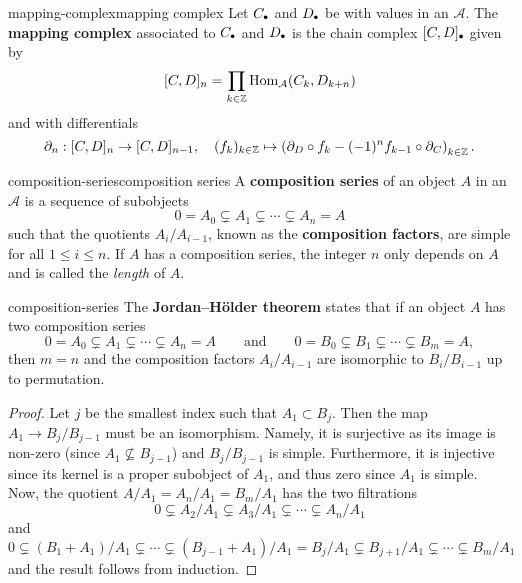 \begin{topic}{mapping-complex}{mapping complex}
    Let $C_\bdot$ and $D_\bdot$ be  with values in an  $\mathcal{A}$. The \textbf{mapping complex} associated to $C_\bdot$ and $D_\bdot$ is the chain complex $[C, D] _\bdot$ given by
    \[ [C, D]_n = \prod_{k \in \mathbb{Z}} \text{Hom}_\mathcal{A}(C_k, D_{k + n}) \]
    and with differentials
    \[ \partial_n : [C, D]_n \to [C, D]_{n - 1}, \quad (f_k)_{k \in \mathbb{Z}} \mapsto \left(\partial_D \circ f_k - (-1)^n f_{k - 1} \circ \partial_C \right)_{k \in \mathbb{Z}} . \]
\end{topic}

\begin{topic}{composition-series}{composition series}
    A \textbf{composition series} of an object $A$ in an  $\mathcal{A}$ is a sequence of subobjects
    \[ 0 = A_0 \subsetneq A_1 \subsetneq \cdots \subsetneq A_n = A \]
    such that the quotients $A_i/A_{i - 1}$, known as the \textbf{composition factors}, are simple for all $1 \le i \le n$. If $A$ has a composition series, the integer $n$ only depends on $A$ and is called the \textit{length} of $A$.
\end{topic}

\begin{example}{composition-series}
    The \textbf{Jordan--Hölder theorem} states that if an object $A$ has two composition series
    \[ 0 = A_0 \subsetneq A_1 \subsetneq \cdots \subsetneq A_n = A \qquad \text{and} \qquad 0 = B_0 \subsetneq B_1 \subsetneq \cdots \subsetneq B_m = A , \]
    then $m = n$ and the composition factors $A_i/A_{i - 1}$ are isomorphic to $B_i/B_{i - 1}$ up to permutation.
    \begin{proof}
        Let $j$ be the smallest index such that $A_1 \subset B_j$. Then the map $A_1 \to B_j/B_{j - 1}$ must be an isomorphism. Namely, it is surjective as its image is non-zero (since $A_1 \nsubseteq B_{j - 1}$) and $B_j/B_{j - 1}$ is simple. Furthermore, it is injective since its kernel is a proper subobject of $A_1$, and thus zero since $A_1$ is simple. Now, the quotient $A/A_1 = A_n/A_1 = B_m/A_1$ has the two filtrations
        \[ 0 \subsetneq A_2/A_1 \subsetneq A_3/A_1 \subsetneq \cdots \subsetneq A_n/A_1 \]
        and
        \[ 0 \subsetneq (B_1 + A_1)/A_1 \subsetneq \cdots \subsetneq (B_{j - 1} + A_1)/A_1 = B_j/A_1 \subsetneq B_{j + 1}/A_1 \subsetneq \cdots \subsetneq B_m/A_1 \]
        and the result follows from induction.    
    \end{proof}
\end{example}

